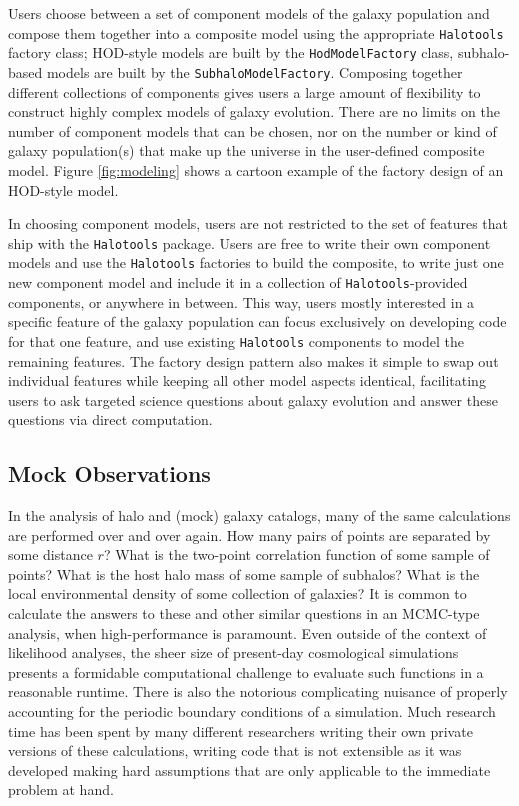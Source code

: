 \documentclass[twocolumn, tighten]{aastex6}
\begin{document}
Users choose between a set of component models of the galaxy population and compose them together into a composite model using the appropriate {\tt Halotools} factory class; HOD-style models are built by the {\tt HodModelFactory} class, subhalo-based models are built by the {\tt SubhaloModelFactory}. Composing together different collections of components gives users a large amount of flexibility to construct highly complex models of galaxy evolution. There are no limits on the number of component models that can be chosen, nor on the number or kind of galaxy population(s) that make up the universe in the user-defined composite model. Figure \ref{fig:modeling} shows a cartoon example of the factory design of an HOD-style model.

In choosing component models, users are not restricted to the set of features that ship with the {\tt Halotools} package. Users are free to write their own component models and use the {\tt Halotools} factories to build the composite, to write just one new component model and include it in a collection of {\tt Halotools}-provided components, or anywhere in between. This way, users mostly interested in a specific feature of the galaxy population can focus exclusively on developing code for that one feature, and use existing {\tt Halotools} components to model the remaining features. The factory design pattern also makes it simple to swap out individual features while keeping all other model aspects identical, facilitating users to ask targeted science questions about galaxy evolution and answer these questions via direct computation.

\subsection{Mock Observations}
\label{subsection:mock_observables}


In the analysis of halo and (mock) galaxy catalogs, many of the same calculations are performed over and over again. How many pairs of points are separated by some distance $r$? What is the two-point correlation function of some sample of points? What is the host halo mass of some sample of subhalos? What is the local environmental density of some collection of galaxies? It is common to calculate the answers to these and other similar questions in an MCMC-type analysis, when high-performance is paramount. Even outside of the context of likelihood analyses, the sheer size of present-day cosmological simulations presents a formidable computational challenge to evaluate such functions in a reasonable runtime. There is also the notorious complicating nuisance of properly accounting for the periodic boundary conditions of a simulation. Much research time has been spent by many different researchers writing their own private versions of these calculations, writing code that is not extensible as it was developed making hard assumptions that are only applicable to the immediate problem at hand.
\end{document}
